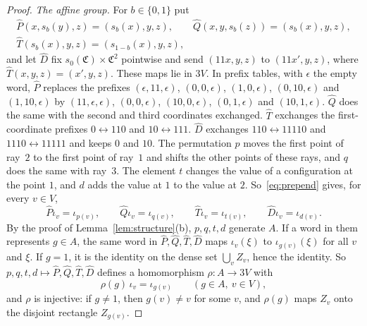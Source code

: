 \begin{proof}
\emph{The affine group.} For $b\in\{0,1\}$ put
\begin{gather*}
\hat P(x,s_b(y),z)=(s_b(x),y,z),\qquad \hat Q(x,y,s_b(z))=(s_b(x),y,z),\\
\hat T(s_b(x),y,z)=(s_{1-b}(x),y,z),
\end{gather*}
and let $\hat D$ fix $s_0(\mathfrak C)\times\mathfrak C^2$ pointwise and send $(11x,y,z)$ to $(11x',y,z)$, where $\hat T(x,y,z)=(x',y,z)$. These maps lie
in $3V$. In prefix tables, with $\epsilon$ the empty word, $\hat P$ replaces the prefixes $(\epsilon,11,\epsilon)$, $(0,0,\epsilon)$, $(1,0,\epsilon)$,
$(0,10,\epsilon)$ and $(1,10,\epsilon)$ by $(11,\epsilon,\epsilon)$, $(0,0,\epsilon)$, $(10,0,\epsilon)$, $(0,1,\epsilon)$ and $(10,1,\epsilon)$. $\hat Q$ does
the same with the second and third coordinates exchanged. $\hat T$ exchanges the first-coordinate prefixes $0\leftrightarrow110$ and
$10\leftrightarrow111$. $\hat D$ exchanges $110\leftrightarrow11110$ and $1110\leftrightarrow11111$ and keeps $0$ and $10$. The permutation $p$ moves
the first point of ray~$2$ to the first point of ray~$1$ and shifts the other points of these rays, and $q$ does the same with ray~$3$. The element
$t$ changes the value of a configuration at the point $1$, and $d$ adds the value at $1$ to the value at $2$. So~\eqref{eq:prepend} gives, for
every $v\in V$,
\[
\hat P\iota_v=\iota_{p(v)},\qquad \hat Q\iota_v=\iota_{q(v)},\qquad \hat T\iota_v=\iota_{t(v)},\qquad \hat D\iota_v=\iota_{d(v)} .
\]
By the proof of Lemma~\ref{lem:structure}(b), $p,q,t,d$ generate $A$. If a word in them represents $g\in A$, the same word in
$\hat P,\hat Q,\hat T,\hat D$ maps $\iota_v(\xi)$ to $\iota_{g(v)}(\xi)$ for all $v$ and $\xi$. If $g=1$, it is the identity on the dense set
$\bigcup_vZ_v$, hence the identity. So $p,q,t,d\mapsto\hat P,\hat Q,\hat T,\hat D$ defines a homomorphism $\rho:A\to3V$ with
\begin{equation}\label{eq:3V-equivariant}
\rho(g)\,\iota_v=\iota_{g(v)}\qquad(g\in A,\ v\in V),
\end{equation}
and $\rho$ is injective: if $g\ne1$, then $g(v)\ne v$ for some $v$, and $\rho(g)$ maps $Z_v$ onto the disjoint rectangle $Z_{g(v)}$.


\end{proof}
